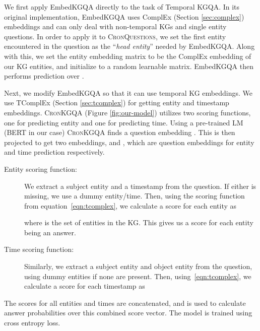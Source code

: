 \documentclass[11pt,a4paper]{article}
\newcommand{\method}{\textsc{CronKGQA}}
\newcommand{\dataset}{\textsc{CronQuestions}}
\begin{document}
We first apply EmbedKGQA \citep{saxena-etal-2020-improving}  directly to the task of Temporal KGQA. In its original implementation, EmbedKGQA uses ComplEx (Section \ref{sec:complex}) embeddings and can only deal with non-temporal KGs and single entity questions. In order to apply it to \dataset{}, we set the first entity encountered in the question as the ``\textit{head entity}'' needed by EmbedKGQA. Along with this, we set the entity embedding matrix   to be the ComplEx embedding of our KG entities, and initialize  to a random learnable matrix. EmbedKGQA then performs prediction over .



Next, we modify EmbedKGQA so that it can use temporal KG embeddings. We use TComplEx (Section \ref{sec:tcomplex}) for getting entity and timestamp embeddings. \method{} (Figure \ref{fig:our-model}) utilizes two scoring functions, one for predicting entity and one for predicting time. Using a pre-trained LM (BERT in our case) \method{} finds a question embedding . This is then projected to get two embeddings,  and , which are question embeddings for entity and time prediction respectively.

\begin{description}
\item[Entity scoring function:] We extract a subject entity  and a timestamp  from the question. If either is missing, we use a dummy entity/time. Then, using the scoring function  from equation~\ref{eqn:tcomplex}, we calculate a score for each entity  as 

where  is the set of entities in the KG. This gives us a score for each entity being an answer. 

\item[Time scoring function:] Similarly, we extract a subject entity  and object entity  from the question, using dummy entities if none are present. Then, using~\ref{eqn:tcomplex}, we calculate a score for each timestamp  as


\end{description}
The scores for all entities and times are concatenated, and  is used to calculate answer probabilities over this combined score vector. The model is trained using cross entropy loss.
\end{document}
